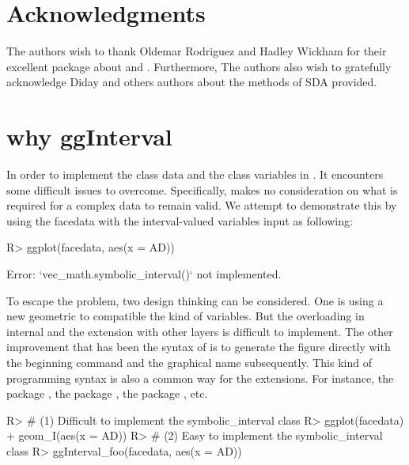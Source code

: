 \documentclass[article]{jss}
\begin{document}
\section*{Acknowledgments}

The authors wish to thank Oldemar Rodriguez and Hadley Wickham for their excellent package about  and  . Furthermore, The authors also wish to gratefully acknowledge Diday and others authors about the methods of SDA provided.

\section*{why ggInterval}\label{sec:pkg_problem}
In order to implement the  class data and the  class variables in . It encounters some difficult issues to overcome. Specifically,  makes no consideration on what is required for a complex data to remain valid. We attempt to demonstrate this by using the facedata with the interval-valued variables input as following:
\begin{CodeChunk}
\begin{CodeInput}
R> ggplot(facedata, aes(x = AD))
\end{CodeInput}
\begin{CodeOutput}
Error: `vec_math.symbolic_interval()` not implemented.
\end{CodeOutput}
\end{CodeChunk}

To escape the problem, two design thinking can be considered. One is using a new geometric to compatible the kind of variables. But the overloading in  internal and the extension with other layers is difficult to implement. The other improvement that has been the syntax of  is to generate the figure directly with the beginning command  and the graphical name subsequently. This kind of programming syntax is also a common way for the  extensions. For instance, the  package \cite{ggtern}, the  package \cite{maag2018gganatogram},
the  package \cite{patil2018ggstatsplot}, etc.

\begin{CodeChunk}
\begin{CodeInput}
R> # (1) Difficult to implement the symbolic_interval class
R> ggplot(facedata) + geom_I(aes(x = AD))
R> # (2) Easy to implement the symbolic_interval class
R> ggInterval_foo(facedata, aes(x = AD))
\end{CodeInput}
\end{CodeChunk}
\end{document}
